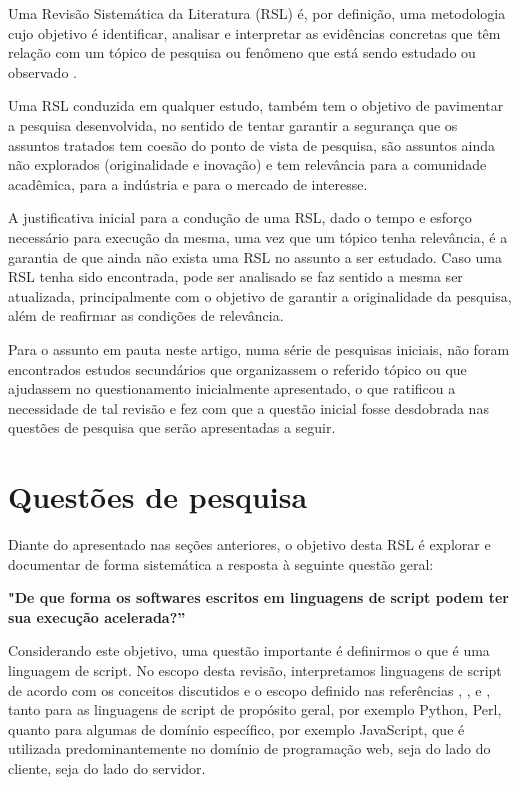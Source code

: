 \documentclass[sigconf]{acmart}
\begin{document}
Uma Revisão Sistemática da Literatura (RSL) é, por definição, uma metodologia cujo objetivo é identificar, analisar e interpretar as evidências concretas que têm relação com um tópico de pesquisa ou fenômeno que está sendo estudado ou observado \cite{nakagawa2017revisao}.

Uma RSL conduzida em qualquer estudo, também tem o objetivo de pavimentar a pesquisa desenvolvida, no sentido de tentar garantir a segurança que os assuntos tratados tem coesão do ponto de vista de pesquisa, são assuntos ainda não explorados (originalidade e inovação) e tem relevância para a comunidade acadêmica, para a indústria e para o mercado de interesse.

A justificativa inicial para a condução de uma RSL, dado o tempo e esforço necessário para execução da mesma, uma vez que um tópico tenha relevância, é a garantia de que ainda não exista uma RSL no assunto a ser estudado. Caso uma RSL tenha sido encontrada, pode ser analisado se faz sentido a mesma ser atualizada, principalmente com o objetivo de garantir a originalidade da pesquisa, além de reafirmar as condições de relevância.

Para o assunto em pauta neste artigo, numa série de pesquisas iniciais, não foram encontrados estudos secundários que organizassem o referido tópico ou que ajudassem no questionamento inicialmente apresentado, o que ratificou a necessidade de tal revisão e fez com que a questão inicial fosse desdobrada nas questões de pesquisa que serão apresentadas a seguir.


\section{Questões de pesquisa}
Diante do apresentado nas seções anteriores, o objetivo desta RSL é explorar e documentar de forma sistemática a resposta à seguinte questão geral: 

\textbf{"De que forma os softwares escritos em linguagens de script podem ter sua execução acelerada?”}

Considerando este objetivo, uma questão importante é definirmos o que é uma linguagem de script. No escopo desta revisão, interpretamos linguagens de script de acordo com os conceitos discutidos e o escopo definido nas referências \cite{loui2008praise}, \cite{van1998glue}, \cite{WikipediaScriptingLanguage:2020} e \cite{WikipediaListofProgrammingLanguagesbyType:2020}, tanto para as linguagens de script de propósito geral, por exemplo Python, Perl, quanto para algumas de domínio específico, por exemplo JavaScript, que é utilizada predominantemente no domínio de programação web, seja do lado do cliente, seja do lado do servidor.
\end{document}
